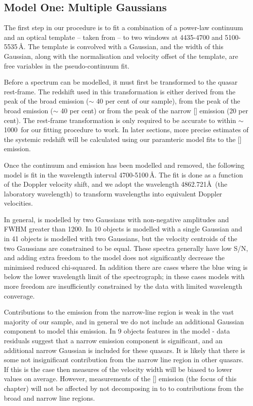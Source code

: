 \subsection{Model One: Multiple Gaussians}

The first step in our procedure is to fit a combination of a power-law continuum and an optical  template -- taken from \citet{boroson92} -- to two windows at 4435-4700 and 5100-5535\,\AA.
The  template is convolved with a Gaussian, and the width of this Gaussian, along with the normalisation and velocity offset of the  template, are free variables in the pseudo-continuum fit.

Before a spectrum can be modelled, it must first be transformed to the quasar rest-frame.  
The redshift used in this transformation is either derived from the peak of the broad \ha emission ($\sim$ 40 per cent of our sample), from the peak of the broad \hb emission ($\sim$ 40 per cent) or from the peak of the narrow [] emission (20 per cent).
The rest-frame transformation is only required to be accurate to within $\sim$1000\kms\, for our fitting procedure to work. 
In later sections, more precise estimates of the systemic redshift will be calculated using our paramteric model fits to the [] emission. 

Once the continuum and  emission has been modelled and removed, the following model is fit in the wavelength interval 4700-5100\,\AA.
The fit is done as a function of the Doppler velocity shift, and we adopt the wavelength 4862.721\AA\, (the laboratory \hb wavelength) to transform wavelengths into equivalent Doppler velocities.

In general, \hb is modelled by two Gaussians with non-negative amplitudes and FWHM greater than 1200\kms.
In 10 objects \hb is modelled with a single Gaussian and in 41 objects \hb is modelled with two Gaussians, but the velocity centroids of the two Gaussians are constrained to be equal. 
These spectra generally have low \ac{S/N}, and adding extra freedom to the model does not significantly decrease the minimised reduced chi-squared.
In addition there are cases where the blue wing is below the lower wavelength limit of the spectrograph; in these cases models with more freedom are insufficiently constrained by the data with limited wavelength converage. 

Contributions to the \hb emission from the narrow-line region is weak in the vast majority of our sample, and in general we do not include an additional Gaussian component to model this emission. 
In 9 objects features in the model - data residuals suggest that a narrow emission component is significant, and an additional narrow Gaussian is included for these quasars. 
It is likely that there is some not insignificant contribution from the narrow line region in other quasars. 
If this is the case then measures of the \hb velocity width will be biased to lower values on average. 
However, measurements of the [] emission (the focus of this chapter) will not be affected by not decomposing \hb in to to contributions from the broad and narrow line regions.  

